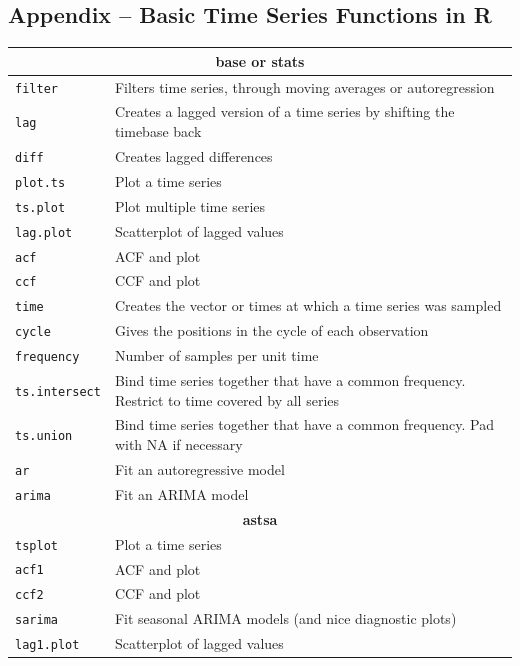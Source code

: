 \begin{withcode}

\section*{Appendix -- Basic Time Series Functions in R}

\renewcommand{\arraystretch}{1.25}
\begin{tabularx}{\textwidth}{l|X} \hline
\multicolumn{2}{c}{\textbf{base or stats}} \\ \hline
\texttt{filter} & Filters time series, through moving averages or autoregression \\
\texttt{lag} & Creates a lagged version of a time series by shifting the timebase back \\
\texttt{diff} & Creates lagged differences \\ 
\texttt{plot.ts} & Plot a time series \\
\texttt{ts.plot} & Plot multiple time series \\
\texttt{lag.plot} & Scatterplot of lagged values \\
\texttt{acf} & ACF and plot \\
\texttt{ccf} & CCF and plot \\ 
\texttt{time} & Creates the vector or times at which a time series was sampled \\
\texttt{cycle} & Gives the positions in the cycle of each observation \\
\texttt{frequency} & Number of samples per unit time \\
\texttt{ts.intersect} & Bind time series together that have a common frequency. Restrict to time covered by all series \\
\texttt{ts.union} & Bind time series together that have a common frequency. Pad with NA if necessary \\ 
\texttt{ar} & Fit an autoregressive model \\ 
\texttt{arima} & Fit an ARIMA model \\ \hline
\multicolumn{2}{c}{\textbf{astsa}} \\ \hline
\texttt{tsplot} & Plot a time series \\
\texttt{acf1} & ACF and plot \\
\texttt{ccf2} & CCF and plot \\
\texttt{sarima} & Fit seasonal ARIMA models (and nice diagnostic plots) \\
\texttt{lag1.plot} & Scatterplot of lagged values \\ \hline
\end{tabularx}

\end{withcode}

